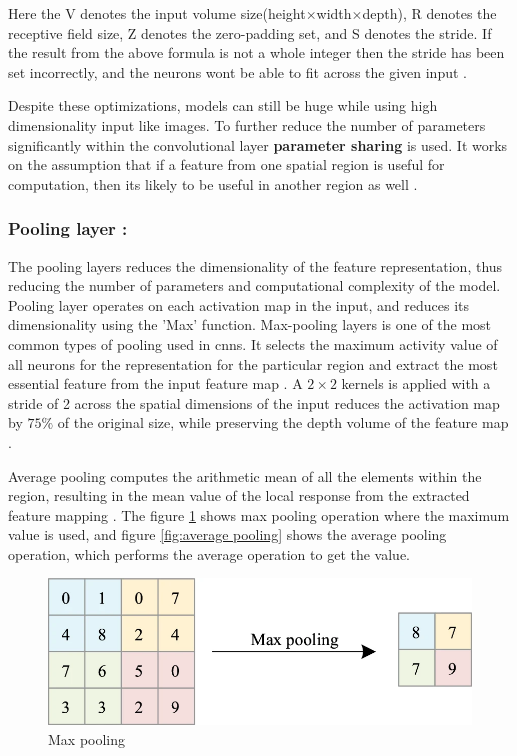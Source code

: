 Here the V denotes the input volume size(height$\times$width$\times$depth), R denotes the receptive field size, Z denotes the zero-padding set, and S denotes the stride. If the result from the above formula is not a whole integer then the stride has been set incorrectly, and the neurons wont be able to fit across the given input \cite{oshea2015introductionconvolutionalneuralnetworks}.

Despite these optimizations, models can still be huge while using high dimensionality input like images. To further reduce the number of parameters significantly within the convolutional layer \textbf{parameter sharing} is used. It works on the assumption that if a feature from one spatial region is useful for computation, then its likely to be useful in another region as well \cite{oshea2015introductionconvolutionalneuralnetworks}.

\subsubsection*{Pooling layer :}

The pooling layers reduces the dimensionality of the feature representation, thus reducing the number of parameters and computational complexity of the model. Pooling layer operates on each activation map in the input, and reduces its dimensionality using the 'Max' function. Max-pooling layers is one of the most common types of pooling used in \glspl{cnn}. It selects the maximum activity value of all neurons for the representation for the particular region and extract the most essential feature from the input feature map \cite{Zhao2024}. A $2\times2$ kernels is applied with a stride of 2 across the spatial dimensions of the input reduces the activation map by $75\%$ of the original size, while preserving the depth volume of the feature map \cite{oshea2015introductionconvolutionalneuralnetworks}. 

Average pooling computes the arithmetic mean of all the elements within the region, resulting in the mean value of the local response from the extracted feature mapping \cite{Zhao2024}. The figure \ref{fig:max pooling} shows max pooling operation where the maximum value is used, and figure \ref{fig:average pooling} shows the average pooling operation, which performs the average operation to get the value.

\begin{figure}[H]
    \centering
    \includegraphics[width=1\linewidth]{Rohit_Master_Thesis//Images/max_pooling.png}
    \caption{Max pooling \cite{Zhao2024}}
    \label{fig:max pooling}
\end{figure}

